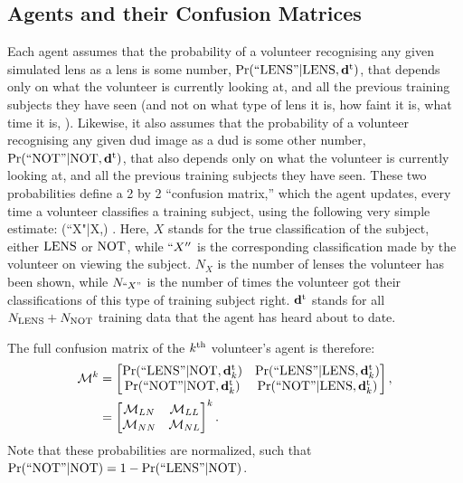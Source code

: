 \documentclass[useAMS,usenatbib,a4paper]{mn2e}
\begin{document}
\subsection{Agents and their Confusion Matrices}
\label{appendix:swap:probabilities}

Each agent assumes that the probability of a volunteer recognising any given
simulated lens as a lens is some number, ${\rm Pr}({\rm ``LENS"}|{\rm LENS},{\mathbf{d}^{\rm t}})$, that
depends only on what the volunteer is currently looking at, and all the
previous training subjects they have seen (and not on what type of lens it is,
how faint it is, what time it is, \etc). Likewise, it also assumes that the
probability of a volunteer recognising any given dud image as a dud is some
other number, ${\rm Pr}({\rm ``NOT"}|{\rm NOT},{\mathbf{d}^{\rm t}})$, that also depends only on what the volunteer is currently looking at, and all the
previous training subjects they have seen. These two probabilities define a 
2 by 2 ``confusion matrix,'' which the agent updates, every time a
volunteer classifies a training subject, using the following 
very simple estimate:
\be
  \pr(``X"|X,\training) \approx {}.
  \label{eq:app:fraction}
\ee
Here, $X$ stands for the true classification of the subject, \ie either
${\rm LENS}$ or ${\rm NOT}$, while $``X''$ is the corresponding classification
made by the volunteer on viewing the subject. $N_X$ is the number of
lenses the volunteer has been shown, while $N_{``X"}$ is the number of 
times the volunteer got their classifications of this type of training subject
right. ${\mathbf{d}^{\rm t}}$ stands for all
$N_{{\rm LENS}} + N_{{\rm NOT}}$ training data that the agent has heard about to
date. 

The full confusion matrix of the $k^{\rm th}$ volunteer's agent is therefore:
\begin{align}
  \mathcal{M}^k &= 
  \begin{bmatrix}
    {\rm Pr}({\rm ``LENS"}|{\rm NOT},{\mathbf{d}^{\rm t}_k}) & {\rm Pr}({\rm ``LENS"}|{\rm LENS},{\mathbf{d}^{\rm t}_k}) \\
    {\rm Pr}({\rm ``NOT"} |{\rm NOT},{\mathbf{d}^{\rm t}_k}) & {\rm Pr}({\rm ``NOT"} |{\rm LENS},{\mathbf{d}^{\rm t}_k})
  \end{bmatrix}, \notag \\
        &=
  \begin{bmatrix}
    \mathcal{M}_{LN} & \mathcal{M}_{LL} \\
    \mathcal{M}_{NN} & \mathcal{M}_{NL}
  \end{bmatrix}^k.
  \label{eq:confmat}
\end{align}
Note that these probabilities are normalized, such that
${\rm Pr}({\rm ``NOT"} |{\rm NOT}) = 1 - {\rm Pr}({\rm ``LENS"}|{\rm NOT})$.
\end{document}
